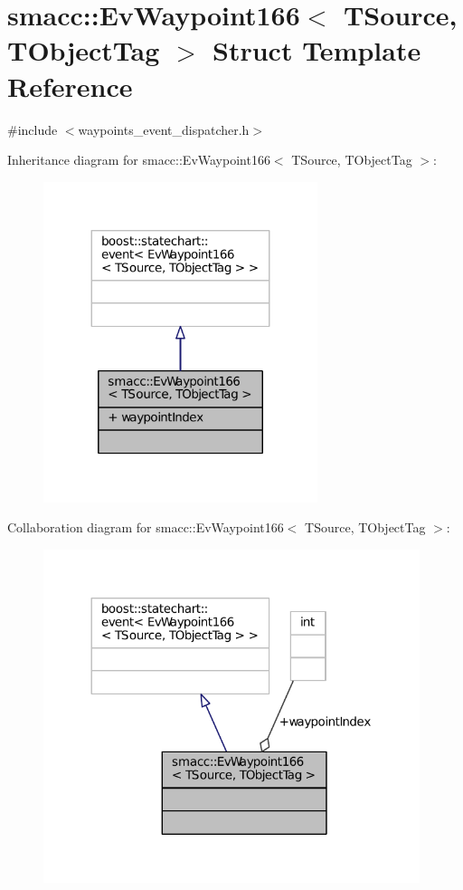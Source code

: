 \hypertarget{structsmacc_1_1EvWaypoint166}{}\section{smacc\+:\+:Ev\+Waypoint166$<$ T\+Source, T\+Object\+Tag $>$ Struct Template Reference}
\label{structsmacc_1_1EvWaypoint166}


{\ttfamily \#include $<$waypoints\+\_\+event\+\_\+dispatcher.\+h$>$}



Inheritance diagram for smacc\+:\+:Ev\+Waypoint166$<$ T\+Source, T\+Object\+Tag $>$\+:
\nopagebreak
\begin{figure}[H]
\begin{center}
\leavevmode
\includegraphics[width=227pt]{structsmacc_1_1EvWaypoint166__inherit__graph}
\end{center}
\end{figure}


Collaboration diagram for smacc\+:\+:Ev\+Waypoint166$<$ T\+Source, T\+Object\+Tag $>$\+:
\nopagebreak
\begin{figure}[H]
\begin{center}
\leavevmode
\includegraphics[width=312pt]{structsmacc_1_1EvWaypoint166__coll__graph}
\end{center}
\end{figure}

